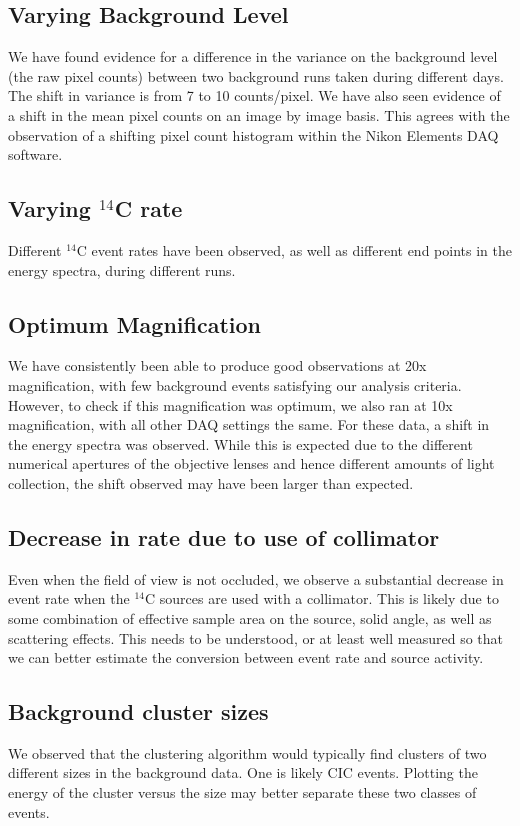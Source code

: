 \documentclass[11pt]{article}
\newcommand{\nuc}[2]{\ensuremath{^{#1}}#2}
\begin{document}
\subsection{Varying Background Level}
We have found evidence for a difference in the variance on the background level (the raw pixel counts) between two background runs taken during different days. 
The shift in variance is from 7 to 10 counts/pixel. We have also seen evidence of a shift in the mean pixel counts on an image by image basis. This agrees with
the observation of a shifting pixel count histogram within the Nikon Elements DAQ software.

\subsection{Varying \nuc{14}{C} rate}
Different \nuc{14}{C} event rates have been observed, as well as different end points in the energy spectra, during different runs. 


\subsection{Optimum Magnification}
We have consistently been able to produce good observations at 20x magnification, with few background events satisfying our analysis criteria. However, to check if this magnification was optimum, we also ran at 10x magnification, with all other DAQ settings the same. For these data, a shift in the energy spectra was observed. While this is expected due to the different numerical apertures of the objective lenses and hence different amounts of light collection, the shift observed may have been larger than expected. 

\subsection{Decrease in rate due to use of collimator}
Even when the field of view is not occluded, we observe a substantial decrease in event rate when the \nuc{14}{C} sources are used with a collimator. This is likely due to some combination of 
effective sample area on the source, solid angle, as well as scattering effects. This needs to be understood, or at least well measured so that we can better estimate the conversion between event rate and source activity.

\subsection{Background cluster sizes}
We observed that the clustering algorithm would typically find clusters of two different sizes in the background data. One is likely CIC events. Plotting the energy of the cluster versus the size may better separate these two classes of events. 
\end{document}
